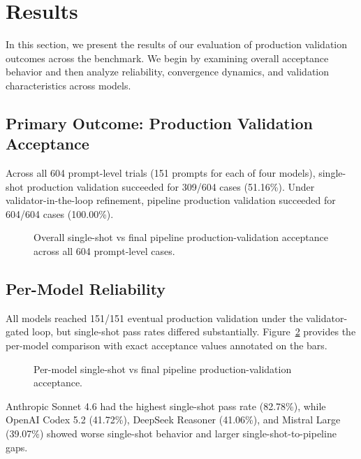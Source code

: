 \section{Results}
\label{sec:results}

In this section, we present the results of our evaluation of production validation outcomes across the benchmark. We begin by examining overall acceptance behavior and then analyze reliability, convergence dynamics, and validation characteristics across models.


\subsection{Primary Outcome: Production Validation Acceptance}
Across all 604 prompt-level trials (151 prompts for each of four models), single-shot production validation succeeded for 309/604 cases (51.16\%). Under validator-in-the-loop refinement, pipeline production validation succeeded for 604/604 cases (100.00\%).

\begin{figure}[H]
\centering
% 
% 

\caption{Overall single-shot vs final pipeline production-validation acceptance across all 604 prompt-level cases.}
\label{fig:overall_baseline_vs_pipeline}
\end{figure}

\subsection{Per-Model Reliability}
All models reached 151/151 eventual production validation under the validator-gated loop, but single-shot pass rates differed substantially. Figure~\ref{fig:by_model_baseline_vs_pipeline} provides the per-model comparison with exact acceptance values annotated on the bars.

\begin{figure}[H]
\centering

\caption{Per-model single-shot vs final pipeline production-validation acceptance.}
\label{fig:by_model_baseline_vs_pipeline}
\end{figure}

Anthropic Sonnet 4.6 had the highest single-shot pass rate (82.78\%), while OpenAI Codex 5.2 (41.72\%), DeepSeek Reasoner (41.06\%), and Mistral Large (39.07\%) showed worse single-shot behavior and larger single-shot-to-pipeline gaps.

